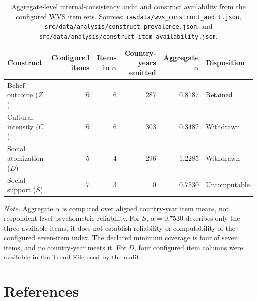 \documentclass[11pt]{article}
\begin{document}
\setcounter{table}{20}%
\begin{table}[!htbp]
\centering
\small
\caption{Aggregate-level internal-consistency audit and construct availability from the configured WVS item sets. Sources: \nolinkurl{rawdata/wvs_construct_audit.json}, \nolinkurl{src/data/analysis/construct_prevalence.json}, and \nolinkurl{src/data/analysis/construct_item_availability.json}.}
\label{tab:construct-reliability}
\begin{tabular}{@{}lrrrrl@{}}
\toprule
\textbf{Construct} & \textbf{Configured items} & \textbf{Items in $\alpha$} & \textbf{Country-years emitted} & \textbf{Aggregate $\alpha$} & \textbf{Disposition}\\
\midrule
Belief outcome ($Z$) & 6 & 6 & 287 & 0.8187 & Retained \\
Cultural intensity ($C$) & 6 & 6 & 303 & 0.3482 & Withdrawn \\
Social atomization ($D$) & 5 & 4 & 296 & $-1.2285$ & Withdrawn \\
Social support ($S$) & 7 & 3 & 0 & 0.7530 & Uncomputable \\
\bottomrule
\end{tabular}

\vspace{4pt}
\justifying\small
\textit{Note.} Aggregate $\alpha$ is computed over aligned country-year item means, not respondent-level psychometric reliability. For $S$, $\alpha=0.7530$ describes only the three available items; it does not establish reliability or computability of the configured seven-item index. The declared minimum coverage is four of seven items, and no country-year meets it. For $D$, four configured item columns were available in the Trend File used by the audit.
\end{table}

\section*{References}
\printbibliography[heading=none]
\end{document}
